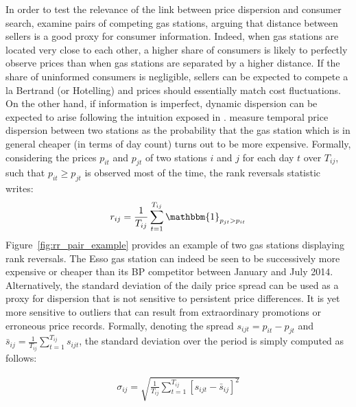 \documentclass[english]{article}
\begin{document}
In order to test the relevance of the link between price dispersion and consumer search, \cite{TAP11} examine pairs of competing gas stations, arguing that distance between sellers is a good proxy for consumer information. Indeed, when gas stations are located very close to each other, a higher share of consumers is likely to perfectly observe prices than when gas stations are separated by a higher distance. If the share of uninformed consumers is negligible, sellers can be expected to compete a la Bertrand (or Hotelling) and prices should essentially match cost fluctuations. On the other hand, if information is imperfect, dynamic dispersion can be expected to arise following the intuition exposed in \cite{VAR80}. \cite{TAP11} measure temporal price dispersion between two stations as the probability that the gas station which is in general cheaper (in terms of day count) turns out to be more expensive. Formally, considering the prices $p_{it}$ and $p_{jt}$ of two stations $i$ and $j$ for each day $t$ over $T_{ij}$, such that $p_{it} \ge p_{jt}$ is observed most of the time, the rank reversals statistic writes:
\begin{align*}
r_{ij} = \frac{1}{T_{ij}} \sum_{t=1}^{T_{ij}} \mathbbm{1}_{p_{jt} > p_{it}}
\end{align*}
Figure~\ref{fig:rr_pair_example} provides an example of two gas stations displaying rank reversals. The Esso gas station can indeed be seen to be successively more expensive or cheaper than its BP competitor between January and July 2014. Alternatively, the standard deviation of the daily price spread can be used as a proxy for dispersion that is not sensitive to persistent price differences. It is yet more sensitive to outliers that can result from extraordinary promotions or erroneous price records. Formally, denoting the spread $s_{ijt} = p_{it} - p_{jt}$ and $\bar{s}_{ij} = \frac{1}{T_{ij}} \sum_{t=1}^{T_{ij}} s_{ijt}$, the standard deviation over the period is simply computed as follows:

\begin{align*}
\sigma_{ij} = \sqrt{\frac{1}{T_{ij}} \sum_{t=1}^{T_{ij}} [s_{ijt} - \bar{s}_{ij}]^2}
\end{align*}
\end{document}
